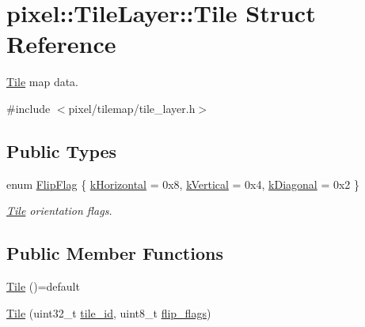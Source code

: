 \hypertarget{structpixel_1_1_tile_layer_1_1_tile}{}\section{pixel\+:\+:Tile\+Layer\+:\+:Tile Struct Reference}
\label{structpixel_1_1_tile_layer_1_1_tile}


\hyperlink{structpixel_1_1_tile_layer_1_1_tile}{Tile} map data.  




{\ttfamily \#include $<$pixel/tilemap/tile\+\_\+layer.\+h$>$}

\subsection*{Public Types}
\begin{DoxyCompactItemize}
\item 
enum \hyperlink{structpixel_1_1_tile_layer_1_1_tile_a0e91c99da154ec494bb4a4bfd719cecb}{Flip\+Flag} \{ \hyperlink{structpixel_1_1_tile_layer_1_1_tile_a0e91c99da154ec494bb4a4bfd719cecbaa12c6e67f336e3789e01e1165bfd021f}{k\+Horizontal} = 0x8, 
\hyperlink{structpixel_1_1_tile_layer_1_1_tile_a0e91c99da154ec494bb4a4bfd719cecba2b6f6b8ea3b102ddfa1bcc96ae1f0ff3}{k\+Vertical} = 0x4, 
\hyperlink{structpixel_1_1_tile_layer_1_1_tile_a0e91c99da154ec494bb4a4bfd719cecba45a791da66d68526760440e0a18d1c3f}{k\+Diagonal} = 0x2
 \}\begin{DoxyCompactList}\small\item\em \hyperlink{structpixel_1_1_tile_layer_1_1_tile}{Tile} orientation flags. \end{DoxyCompactList}
\end{DoxyCompactItemize}
\subsection*{Public Member Functions}
\begin{DoxyCompactItemize}
\item 
\hyperlink{structpixel_1_1_tile_layer_1_1_tile_a44058872bb600a1b7366b8f4ff8b5d14}{Tile} ()=default
\item 
\hyperlink{structpixel_1_1_tile_layer_1_1_tile_a12e70bb3ac4537fcc2e88ac2aaff6ca5}{Tile} (uint32\+\_\+t \hyperlink{structpixel_1_1_tile_layer_1_1_tile_a5f4c70323cd0793bd2cbe0c23247de56}{tile\+\_\+id}, uint8\+\_\+t \hyperlink{structpixel_1_1_tile_layer_1_1_tile_a69642d11eccac2819b3b56dc07859f63}{flip\+\_\+flags})
\end{DoxyCompactItemize}
